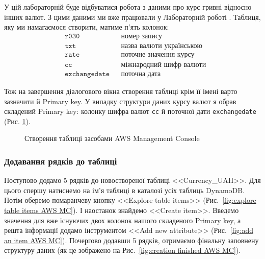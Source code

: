\documentclass[a4paper,14pt]{extarticle} %
\begin{document}
У цій лабораторній буде відбуватися робота з даними про курс гривні відносно інших валют. З цими даними ми вже 
працювали у Лабораторній роботі . Таблиця, яку ми намагаємося створити, матиме п'ять колонок:
\begin{align*}
    &\texttt{r030} &&\text{номер запису} \\
    &\texttt{txt} &&\text{назва валюти українською} \\
    &\texttt{rate} &&\text{поточне значення курсу} \\
    &\texttt{cc} &&\text{міжнародний шифр валюти} \\
    &\texttt{exchangedate} &&\text{поточна дата}
\end{align*}

Тож на завершення діалогового вікна створення таблиці крім її імені варто зазначити й  Primary key. У випадку 
структури даних курсу валют я обрав складений Primary key: колонку шифра валют \texttt{cc} й поточної дати 
\texttt{exchangedate} (Рис. \ref{fig:create table AWS MC}).

\begin{figure}[H]
    \caption{Створення таблиці засобами AWS Management Console}
    \label{fig:create table AWS MC}
\end{figure}

\subsubsection*{Додавання рядків до таблиці}

Поступово додамо 5 рядків до новоствореної таблиці <<Currency\_UAH>>. Для цього спершу натиснемо на ім'я таблиці 
в каталозі усіх таблиць DynamoDB. Потім оберемо помаранчеву кнопку <<Explore table items>> 
(Рис.~\ref{fig:explore table items AWS MC}). І наостанок знайдемо <<Create item>>. Введемо значення для вже 
існуючих двох колонок нашого складеного Primary key, а решта інформації додамо інструментом <<Add new attribute>> 
(Рис.~\ref{fig:add an item AWS MC}). Почергово додавши 5 рядків, отримаємо фінальну заповнену структуру даних 
(як це зображено на Рис.~\ref{fig:creation finished AWS MC}).
\end{document}
